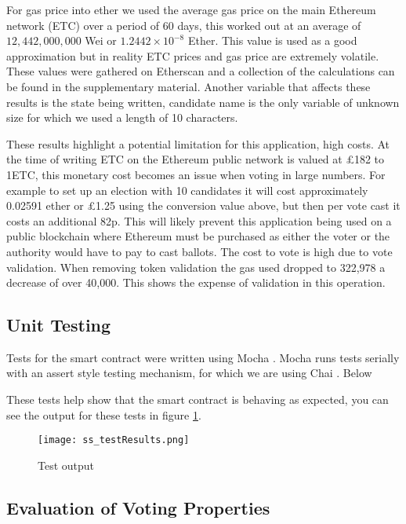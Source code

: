 \documentclass{entcs}
\begin{document}
For gas price into ether we used the average gas price on the main Ethereum network (ETC) over a period of 60 days, this worked out at an average of \(12,442,000,000\) Wei or \(1.2442 \times 10^{-8}\) Ether. This value is used as a good approximation but in reality ETC prices and gas price are extremely volatile. These values were gathered on Etherscan \cite{gasprice} and a collection of the calculations can be found in the supplementary material. Another variable that affects these results is the state being written, candidate name is the only variable of unknown size for which we used a length of 10 characters.

These results highlight a potential limitation for this application, high costs. At the time of writing ETC on the Ethereum public network is valued at £182 to 1ETC, this monetary cost becomes an issue when voting in large numbers. For example to set up an election with 10 candidates it will cost approximately 0.02591 ether or £1.25 using the conversion value above, but then per vote cast it costs an additional 82p. This will likely prevent this application being used on a public blockchain where Ethereum must be purchased as either the voter or the authority would have to pay to cast ballots. The cost to vote is high due to vote validation. When removing token validation the gas used dropped to 322,978 a decrease of over 40,000. This shows the expense of validation in this operation.

\subsection{Unit Testing}
Tests for the smart contract were written using Mocha \cite{mocha}. Mocha runs tests serially with an assert style testing mechanism, for which we are using Chai \cite{chai}. Below

These tests help show that the smart contract is behaving as expected, you can see the output for these tests in figure \ref{fig:testResults}.

\begin{figure}[h!]
    \centering
    \texttt{[image: ss\_testResults.png]}
    \caption{Test output}
    \label{fig:testResults}
\end{figure}




\subsection{Evaluation of Voting Properties}\label{sec: Eval}
\end{document}
